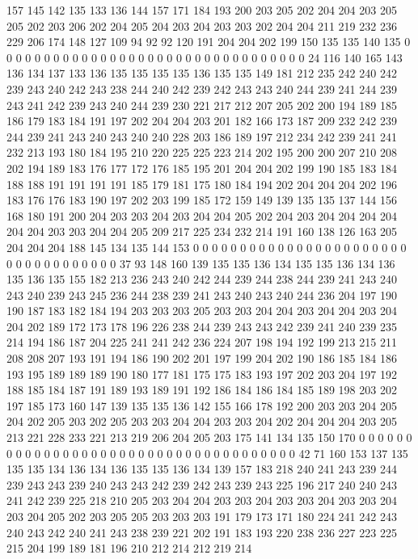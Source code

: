 157 145 142 135 133 136 144 157 171 184 193 200 203 205 202 204 204 203 205 205
202 203 206 202 204 205 204 203 204 203 203 202 204 204 211 219 232 236 229 206
174 148 127 109 94 92 92 120 191 204 204 202 199 150 135 135 140 135 0 0
0 0 0 0 0 0 0 0 0 0 0 0 0 0 0 0 0 0 0 0
0 0 0 0 0 0 0 0 0 0 0 24 116 140 165 143 136 134 137 133
136 135 135 135 135 136 135 135 149 181 212 235 242 240 242 239 243 240 242 243
238 244 240 242 239 242 243 243 240 244 239 241 244 239 243 241 242 239 243 240
244 239 230 221 217 212 207 205 202 200 194 189 185 186 179 183 184 191 197 202
204 204 203 201 182 166 173 187 209 232 242 239 244 239 241 243 240 243 240 240
228 203 186 189 197 212 234 242 239 241 241 232 213 193 180 184 195 210 220 225
225 223 214 202 195 200 200 207 210 208 202 194 189 183 176 177 172 176 185 195
201 204 204 202 199 190 185 183 184 188 188 191 191 191 191 185 179 181 175 180
184 194 202 204 204 204 202 196 183 176 176 183 190 197 202 203 199 185 172 159
149 139 135 135 137 144 156 168 180 191 200 204 203 203 204 203 204 204 205 202
204 203 204 204 204 204 204 204 203 203 204 204 205 209 217 225 234 232 214 191
160 138 126 163 205 204 204 204 188 145 134 135 144 153 0 0 0 0 0 0
0 0 0 0 0 0 0 0 0 0 0 0 0 0 0 0 0 0 0 0
0 0 0 0 0 0 0 0 0 37 93 148 160 139 135 135 136 134 135 135
136 134 136 135 136 135 155 182 213 236 243 240 242 244 239 244 238 244 239 241
243 240 243 240 239 243 245 236 244 238 239 241 243 240 243 240 244 236 204 197
190 190 187 183 182 184 194 203 203 203 205 203 203 204 204 203 204 204 203 204
204 202 189 172 173 178 196 226 238 244 239 243 243 242 239 241 240 239 235 214
194 186 187 204 225 241 241 242 236 224 207 198 194 192 199 213 215 211 208 208
207 193 191 194 186 190 202 201 197 199 204 202 190 186 185 184 186 193 195 189
189 189 190 180 177 181 175 175 183 193 197 202 203 204 197 192 188 185 184 187
191 189 193 189 191 192 186 184 186 184 185 189 198 203 202 197 185 173 160 147
139 135 135 136 142 155 166 178 192 200 203 203 204 205 204 202 205 203 202 205
203 203 204 204 203 203 204 202 204 204 204 203 205 213 221 228 233 221 213 219
206 204 205 203 175 141 134 135 150 170 0 0 0 0 0 0 0 0 0 0
0 0 0 0 0 0 0 0 0 0 0 0 0 0 0 0 0 0 0 0
0 0 0 0 0 0 0 42 71 160 153 137 135 135 135 134 136 134 136 135
135 136 134 139 157 183 218 240 241 243 239 244 239 243 243 239 240 243 243 242
239 242 243 239 243 225 196 217 240 240 243 241 242 239 225 218 210 205 203 204
204 203 203 204 203 203 204 203 203 204 203 204 205 202 203 205 205 203 203 203
191 179 173 171 180 224 241 242 243 240 243 242 240 241 243 238 239 221 202 191
183 193 220 238 236 227 223 225 215 204 199 189 181 196 210 212 214 212 219 214
